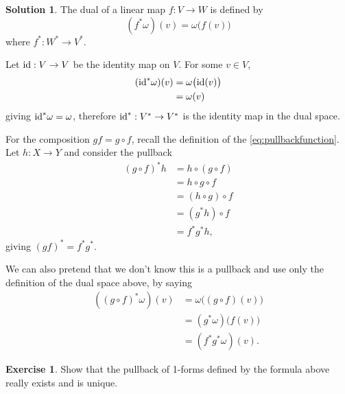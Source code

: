 \documentclass[11pt, a4paper]{report}
\theoremstyle{definition}
\newtheorem{exercise}{Exercise}[part]
\newtheorem{solution}{Solution}[part]
\newenvironment{ex}{\begin{exercise}}{\end{exercise}\pagebreak[1]}
\newenvironment{sol}{\begin{solution}}{\end{solution}\pagebreak[3]}
\newcommand*{\id}{\ensuremath\mathop{}\mathopen{}\mathrm{id}}
\begin{document}
\begin{sol}

The dual of a linear map $f: V \to W$ is defined by
\[
    (f^*\omega)(v) = \omega \bigl( f(v) \bigr)
\]
where $f^*: W^* \to V^*$.

Let $\id: V \to V$ be the identity map on $V$. For some $v \in V$,
\begin{align*}
    (\id^*\omega)(v) &= \omega \bigl( \id(v) \bigr) \\
                           &= \omega(v)
\end{align*}
giving $\id^*\omega = \omega$, therefore $\id^*: V^* \to V^*$ is the identity map in the dual space.

For the composition $gf = g \circ f$, recall the definition of the \ref{eq:pullbackfunction}. %
Let $h: X \to Y$ and consider the pullback
\begin{align*}
    {(g \circ f)}^* h &= h \circ (g \circ f) \\
                      &= h \circ g \circ f \\
                      &= (h \circ g) \circ f \\
                      &= (g^* h) \circ f \\
                      &= f^* g^* h,
\end{align*}
giving ${(gf)}^* = f^* g^*$.

We can also pretend that we don't know this is a pullback and use only the definition of the dual space above, by saying
\begin{align*}
    ({(g \circ f)}^*\omega)(v) &= \omega \bigl( (g \circ f)(v) \bigr) \\
        &= (g^* \omega) \bigl( f(v) \bigr) \\
        &= (f^* g^* \omega)(v).
\end{align*}

\end{sol}

\begin{ex}

Show that the pullback of 1-forms defined by the formula above really exists and is unique.

\end{ex}
\end{document}
